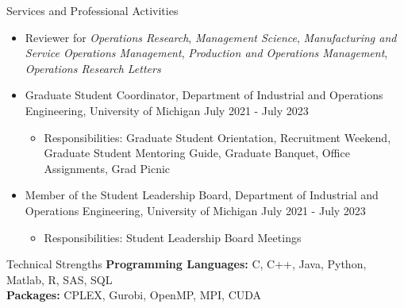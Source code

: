 \documentclass{resume}
\begin{document}
\begin{rSection}{Services and Professional Activities} 
\begin{itemize}
  \item Reviewer for \textit{Operations Research}, \textit{Management Science}, \textit{Manufacturing and Service Operations Management}, \textit{Production and Operations Management}, \textit{Operations Research Letters}
    \item Graduate Student Coordinator, Department of Industrial and Operations Engineering, University of Michigan \hfill July 2021 - July 2023
    \begin{itemize}
      \item Responsibilities: Graduate Student Orientation, Recruitment Weekend, Graduate Student Mentoring Guide, Graduate Banquet, Office Assignments, Grad Picnic
  \end{itemize}
    \item Member of the Student Leadership Board, Department of Industrial and Operations Engineering, University of Michigan \hfill July 2021 - July 2023
    \begin{itemize}
      \item Responsibilities: Student Leadership Board Meetings
  \end{itemize}
    
\end{itemize}
\end{rSection}

\begin{rSection}{Technical Strengths}
{\bf Programming Languages: } C, C++, Java, Python, Matlab, R, SAS, SQL\\
{\bf Packages: } CPLEX, Gurobi, OpenMP, MPI, CUDA
\end{rSection}
\end{document}
